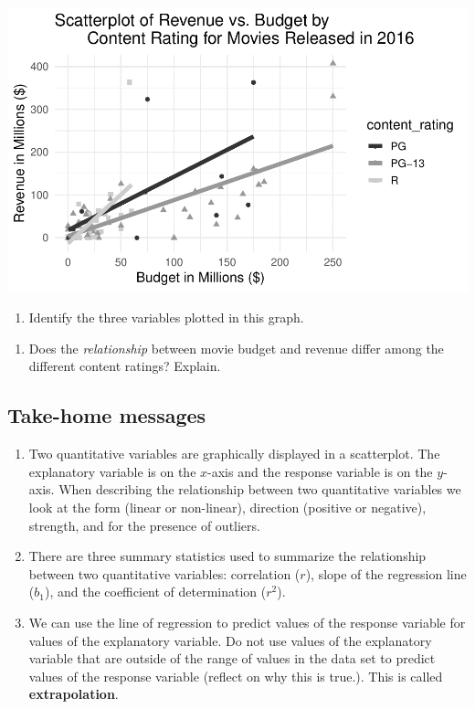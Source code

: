 \documentclass[
]{report}
\providecommand{\tightlist}{%
  \setlength{\itemsep}{0pt}\setlength{\parskip}{0pt}}
\begin{document}
\begin{center}\includegraphics[width=0.7\linewidth]{04-A04-EDA-two-quantitative-LR_files/figure-latex/unnamed-chunk-4-1} \end{center}

\begin{enumerate}
\def\labelenumi{\arabic{enumi}.}
\setcounter{enumi}{10}
\tightlist
\item
  Identify the three variables plotted in this graph.
\end{enumerate}

\vspace{0.5in}

\begin{enumerate}
\def\labelenumi{\arabic{enumi}.}
\setcounter{enumi}{11}
\tightlist
\item
  Does the \emph{relationship} between movie budget and revenue differ among the different content ratings? Explain.
\end{enumerate}

\vspace{0.8in}
\newpage

\hypertarget{take-home-messages-7}{%
\subsection{Take-home messages}\label{take-home-messages-7}}

\begin{enumerate}
\def\labelenumi{\arabic{enumi}.}
\item
  Two quantitative variables are graphically displayed in a scatterplot. The explanatory variable is on the \(x\)-axis and the response variable is on the \(y\)-axis. When describing the relationship between two quantitative variables we look at the form (linear or non-linear), direction (positive or negative), strength, and for the presence of outliers.
\item
  There are three summary statistics used to summarize the relationship between two quantitative variables: correlation (\(r\)), slope of the regression line (\(b_1\)), and the coefficient of determination (\(r^2\)).
\item
  We can use the line of regression to predict values of the response variable for values of the explanatory variable. Do not use values of the explanatory variable that are outside of the range of values in the data set to predict values of the response variable (reflect on why this is true.). This is called \textbf{extrapolation}.
\end{enumerate}
\end{document}
